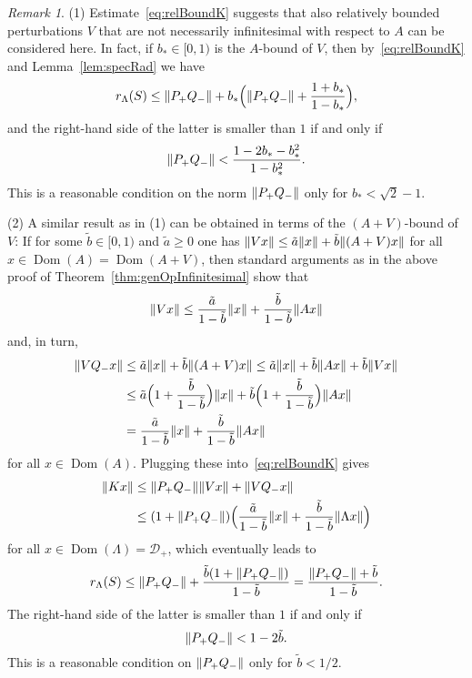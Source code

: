 \documentclass[11pt,a4paper]{amsart}
\numberwithin{equation}{section}
\DeclareMathOperator{\Dom}{Dom}
\DeclarePairedDelimiter{\norm}{\lVert}{\rVert}
\newcommand{\cD}{{\mathcal D}}
\theoremstyle{plain}
\theoremstyle{definition}
\theoremstyle{remark}
\newtheorem{remark}[theorem]{Remark}
\begin{document}
\begin{remark}\label{rem:relBoundK}
  (1)
  Estimate~\eqref{eq:relBoundK} suggests that also relatively bounded perturbations $V$ that are not necessarily infinitesimal
  with respect to $A$ can be considered here. In fact, if $b_*\in[0,1)$ is the $A$-bound of $V$, then by~\eqref{eq:relBoundK} and
  Lemma~\ref{lem:specRad} we have
  \begin{equation*}
    r_\Lambda(S)
    \le
    \norm{P_+Q_-} + b_*\Bigl(\norm{P_+Q_-}+\frac{1+b_*}{1-b_*}\Bigr)
    ,
  \end{equation*}
  and the right-hand side of the latter is smaller than $1$ if and only if
  \begin{equation*}
    \norm{P_+Q_-} < \frac{1-2b_*-b_*^2}{1-b_*^2}.
  \end{equation*}
  This is a reasonable condition on the norm $\norm{P_+Q_-}$ only for $b_*<\sqrt{2}-1$.

  (2)
  A similar result as in (1) can be obtained in terms of the $(A+V)$-bound of $V$: If for some $\tilde{b}\in[0,1)$ and
  $\tilde{a}\ge 0$ one has $\norm{Vx} \le \tilde{a}\norm{x} + \tilde{b}\norm{(A+V)x}$ for all $x\in\Dom(A)=\Dom(A+V)$, then
  standard arguments as in the above proof of Theorem~\ref{thm:genOpInfinitesimal} show that
  \begin{equation*}
    \norm{Vx}
    \le
    \frac{\tilde{a}}{1-\tilde{b}}\norm{x} + \frac{\tilde{b}}{1-\tilde{b}}\norm{Ax}
  \end{equation*}
  and, in turn,
  \begin{align*}
    \norm{VQ_-x}
    &\le
    \tilde{a}\norm{x} + \tilde{b}\norm{(A+V)x}
      \le
      \tilde{a}\norm{x} + \tilde{b}\norm{Ax} + \tilde{b}\norm{Vx}\\
    &\le
    \tilde{a}\Bigl( 1 + \frac{\tilde{b}}{1-\tilde{b}} \Bigr)\norm{x}
      + \tilde{b}\Bigl( 1 + \frac{\tilde{b}}{1-\tilde{b}} \Bigr)\norm{Ax}\\
    &=
    \frac{\tilde{a}}{1-\tilde{b}}\norm{x} + \frac{\tilde{b}}{1-\tilde{b}}\norm{Ax}
  \end{align*}
  for all $x\in\Dom(A)$. Plugging these into~\eqref{eq:relBoundK} gives
  \begin{align*}
    \norm{Kx}
    &\le
    \norm{P_+Q_-}\norm{Vx} + \norm{VQ_-x}\\
    &\le
    (1+\norm{P_+Q_-})\Bigl( \frac{\tilde{a}}{1-\tilde{b}}\norm{x} + \frac{\tilde{b}}{1-\tilde{b}}\norm{\Lambda x} \Bigr)
  \end{align*}
  for all $x \in \Dom(\Lambda) = \cD_+$, which eventually leads to
  \begin{equation*}
    r_\Lambda(S)
    \le
    \norm{P_+Q_-} + \frac{\tilde{b}(1+\norm{P_+Q_-})}{1-\tilde{b}}
    =
    \frac{\norm{P_+Q_-}+\tilde{b}}{1-\tilde{b}}
    .
  \end{equation*}
  The right-hand side of the latter is smaller than $1$ if and only if
  \begin{equation*}
    \norm{P_+Q_-} < 1-2\tilde{b}.
  \end{equation*}
  This is a reasonable condition on $\norm{P_+Q_-}$ only for $\tilde{b} < 1/2$.
\end{remark}
\end{document}
